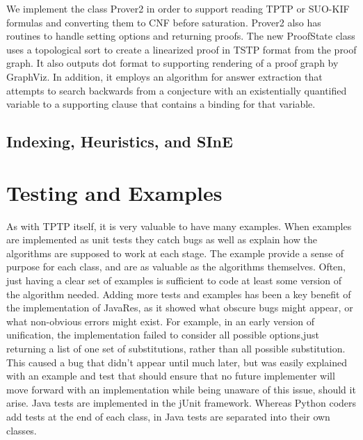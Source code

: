 \documentclass{llncs}
\begin{document}
We implement the class Prover2 in order to support reading TPTP or SUO-KIF formulas and converting them
to CNF before saturation.  Prover2 also has routines to handle setting options and returning proofs.  The new
ProofState class uses a topological sort \cite{DBLP:journals/cacm/Kahn62} to create a linearized proof in
TSTP format from the proof graph.  It also outputs dot format to supporting rendering of a proof graph
by GraphViz.  In addition, it employs an algorithm for answer extraction that attempts to search backwards
from a conjecture with an existentially quantified variable to a supporting clause that contains a binding
for that variable.

\subsection{Indexing, Heuristics, and SInE}


\section{Testing and Examples}

As with TPTP itself, it is very valuable to have many examples.  When examples are implemented as
unit tests they catch bugs as well as explain how the algorithms are supposed to work at each stage.
The example provide a sense of purpose for each class, and are as valuable as the algorithms
themselves.  Often, just having a clear set of examples is sufficient to code at least some version
of the algorithm needed.  Adding more tests and examples has been a key benefit of the implementation
of JavaRes, as it showed what obscure bugs might appear, or what non-obvious errors might exist.
For example, in an early version of unification, the implementation failed to consider all possible
options,just returning a list of one set of substitutions, rather than all possible substitution.
This caused a bug that didn't appear until much later, but was easily explained with an example and
test that should ensure that no future implementer will move forward with an implementation while
being unaware of this issue, should it arise.  Java tests are implemented in the jUnit framework.
Whereas Python coders add tests at the end of each class, in Java tests  are separated into their
own classes.


\end{document}
